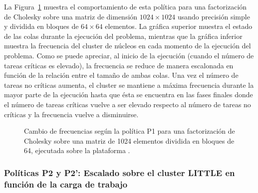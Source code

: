 La Figura~\ref{s5:fig:P1-evo} muestra el comportamiento de esta política
para una factorización de Cholesky sobre una matriz de dimensión
$1024 \times 1024$ usando precisión simple y dividida en bloques de
$64 \times 64$ elementos. La gráfica superior muestra el estado de las
colas durante la ejecución del problema, mientras que la gráfica inferior
muestra la frecuencia del cluster de núcleos \LITTLE en cada momento de la
ejecución del problema. Como se puede apreciar, al inicio de la ejecución
(cuando el número de tareas críticas es elevado), la frecuencia se reduce
de manera escalonada en función de la relación entre el tamaño de ambas
colas. Una vez el número de tareas no críticas aumenta, el cluster se
mantiene a máxima frecuencia durante la mayor parte de la ejecución hasta
que ésta se encuentra en las fases finales donde el número de tareas
críticas vuelve a ser elevado respecto al número de tareas no críticas y la
frecuencia vuelve a disminuirse.

\begin{figure}
  \centering
  \caption[Cambio de frecuencias según la política P1]{Cambio de
    frecuencias según la política P1 para una factorización de Cholesky
    sobre una matriz de 1024 elementos dividida en bloques de 64, ejecutada
    sobre la plataforma \juno.}
  \label{s5:fig:P1-evo}
\end{figure}

\subsubsection{Políticas P2 y P2': Escalado sobre el cluster LITTLE en
  función de la carga de trabajo}

